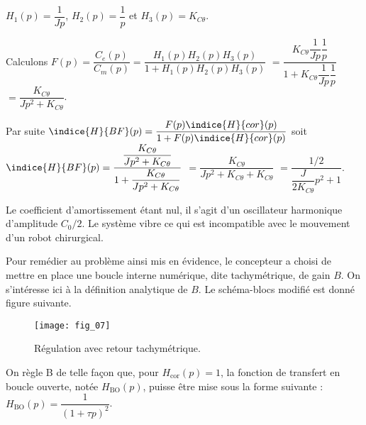 \ifprof
\begin{corrige}
$H_1(p)=\dfrac{1}{Jp}$, $H_2(p)=\dfrac{1}{p}$ et $H_3(p)=K_{C\theta}$.
\end{corrige}
\else
\fi


\ifprof
\begin{corrige}
Calculons $F(p) =\dfrac{C_e(p)}{C_m(p)} = \dfrac{H_1(p)H_2(p)H_3(p)}{1+H_1(p)H_2(p)H_3(p)}$
$= \dfrac{K_{C\theta}\dfrac{1}{Jp}\dfrac{1}{p}}{1+K_{C\theta}\dfrac{1}{Jp}\dfrac{1}{p}}$
$= \dfrac{K_{C\theta}}{Jp^2+K_{C\theta}}$.

Par suite $\indice{H}{BF}(p)=\dfrac{F(p) \indice{H}{cor}(p)}{1+F(p) \indice{H}{cor}(p)}$ soit
 $\indice{H}{BF}(p)= \dfrac{\dfrac{K_{C\theta}}{Jp^2+K_{C\theta}} }{1+\dfrac{K_{C\theta}}{Jp^2+K_{C\theta}} }$
$= \dfrac{K_{C\theta}}{Jp^2+K_{C\theta}+K_{C\theta} }$
$= \dfrac{1/2}{\dfrac{J}{2K_{C\theta}}p^2+1 }$.
\end{corrige}
\else
\fi

\ifprof
\begin{corrige}
Le coefficient d'amortissement étant nul, il s'agit d'un oscillateur harmonique d'amplitude $C_0/2$. Le système vibre ce qui est incompatible avec le mouvement d'un robot chirurgical.
\end{corrige}
\else
\fi



Pour remédier au problème ainsi mis en évidence, le concepteur a choisi de mettre en place une boucle
interne numérique, dite tachymétrique, de gain $B$. On s’intéresse ici à la définition analytique de $B$.
Le schéma-blocs modifié est donné figure suivante.


\begin{figure}[!h]
\centering
\texttt{[image: fig\_07]}

\caption{Régulation avec retour tachymétrique.}
\end{figure}




On règle B de telle façon que, pour $H_{\text{cor}}(p)=1$, la fonction de transfert en boucle ouverte, notée $H_{\text{BO}}(p)$, puisse être mise sous la forme suivante : 
$H_{\text{BO}}(p)=\dfrac{1}{\left(1+\tau p\right)^2}$.




